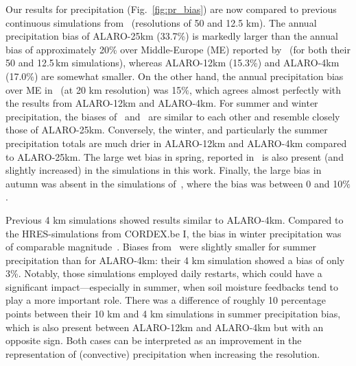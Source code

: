 \documentclass[journal abbreviation, manuscript]{copernicus}
\begin{document}
Our results for precipitation (Fig.~\ref{fig:pr_bias}) are now compared to previous continuous simulations from~\citet{giot_validation_2016} (resolutions of 50 and 12.5 km).
The annual precipitation bias of ALARO-25km (33.7\%) is markedly larger than the annual bias of approximately 20\% over Middle-Europe (ME) reported by~\citet{giot_validation_2016} (for both their 50 and 12.5\,km simulations), whereas ALARO-12km (15.3\%) and ALARO-4km (17.0\%) are somewhat smaller.
On the other hand, the annual precipitation bias over ME in~\citet{berckmans_reinitialised_2017} (at 20 km resolution) was 15$\%$, which agrees almost perfectly with the results from ALARO-12km and ALARO-4km. 
For summer and winter precipitation, the biases of~\citet{berckmans_reinitialised_2017} and~\citet{giot_validation_2016} are similar to each other and resemble closely those of ALARO-25km. 
Conversely, the winter, and particularly the summer precipitation totals are much drier in ALARO-12km and ALARO-4km compared to ALARO-25km.
The large wet bias in spring, reported in~\citet{giot_validation_2016} is also present (and slightly increased) in the simulations in this work.
Finally, the large bias in autumn was absent in the simulations of~\citet{giot_validation_2016}, where the bias was between 0 and 10$\%$.

Previous 4 km simulations showed results similar to ALARO-4km.
Compared to the HRES-simulations from CORDEX.be I, the bias in winter precipitation was of comparable magnitude~\citep{termonia_combining_2018}.
Biases from~\citet{de_troch_multiscale_2013} were slightly smaller for summer precipitation than for ALARO-4km: their 4 km simulation showed a bias of only 3\%.
Notably, those simulations employed daily restarts, which could have a significant impact—especially in summer, when soil moisture feedbacks tend to play a more important role.
There was a difference of roughly 10 percentage points between their 10 km and 4 km simulations in summer precipitation bias, which is also present between ALARO-12km and ALARO-4km but with an opposite sign. 
Both cases can be interpreted as an improvement in the representation of (convective) precipitation when increasing the resolution. 
\end{document}
